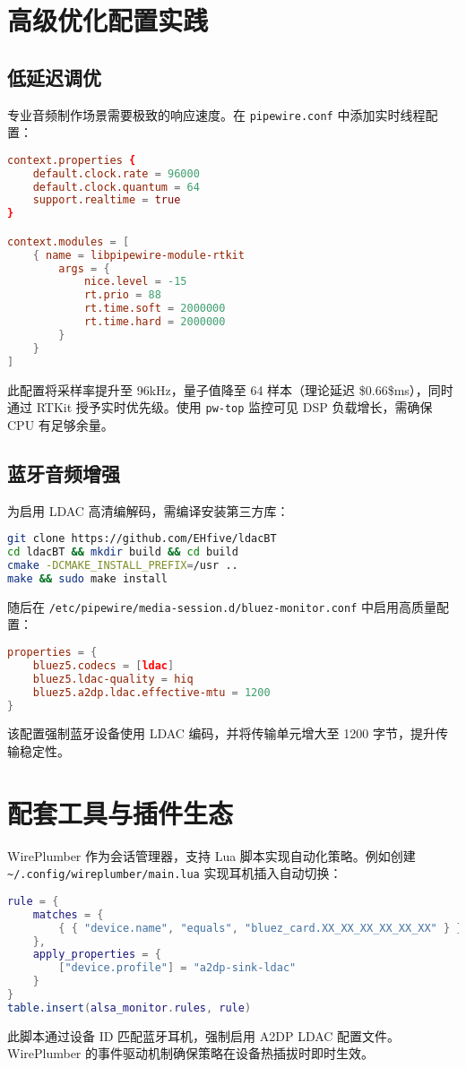 \chapter{高级优化配置实践}
\section{低延迟调优}
专业音频制作场景需要极致的响应速度。在 \verb!pipewire.conf! 中添加实时线程配置：\par
\begin{lstlisting}[language=conf]
context.properties {
    default.clock.rate = 96000
    default.clock.quantum = 64
    support.realtime = true
}

context.modules = [
    { name = libpipewire-module-rtkit
        args = {
            nice.level = -15
            rt.prio = 88
            rt.time.soft = 2000000
            rt.time.hard = 2000000
        }
    }
]
\end{lstlisting}
此配置将采样率提升至 96kHz，量子值降至 64 样本（理论延迟 \${}0.66\${}ms），同时通过 RTKit 授予实时优先级。使用 \verb!pw-top! 监控可见 DSP 负载增长，需确保 CPU 有足够余量。\par
\section{蓝牙音频增强}
为启用 LDAC 高清编解码，需编译安装第三方库：\par
\begin{lstlisting}[language=bash]
git clone https://github.com/EHfive/ldacBT
cd ldacBT && mkdir build && cd build
cmake -DCMAKE_INSTALL_PREFIX=/usr ..
make && sudo make install
\end{lstlisting}
随后在 \verb!/etc/pipewire/media-session.d/bluez-monitor.conf! 中启用高质量配置：\par
\begin{lstlisting}[language=conf]
properties = {
    bluez5.codecs = [ldac]
    bluez5.ldac-quality = hiq
    bluez5.a2dp.ldac.effective-mtu = 1200
}
\end{lstlisting}
该配置强制蓝牙设备使用 LDAC 编码，并将传输单元增大至 1200 字节，提升传输稳定性。\par
\chapter{配套工具与插件生态}
WirePlumber 作为会话管理器，支持 Lua 脚本实现自动化策略。例如创建 \verb!~/.config/wireplumber/main.lua! 实现耳机插入自动切换：\par
\begin{lstlisting}[language=lua]
rule = {
    matches = {
        { { "device.name", "equals", "bluez_card.XX_XX_XX_XX_XX_XX" } }
    },
    apply_properties = {
        ["device.profile"] = "a2dp-sink-ldac"
    }
}
table.insert(alsa_monitor.rules, rule)
\end{lstlisting}
此脚本通过设备 ID 匹配蓝牙耳机，强制启用 A2DP LDAC 配置文件。WirePlumber 的事件驱动机制确保策略在设备热插拔时即时生效。\par
